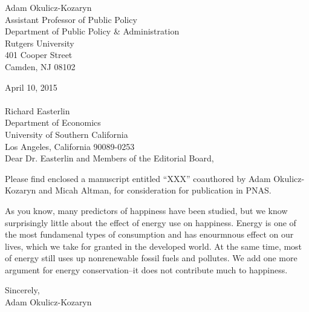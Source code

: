\documentclass[10pt, letterpaper]{article}
\date{ }
\title{}
\author{
}
\begin{document}
\begin{flushright}
Adam Okulicz-Kozaryn\\
Assistant Professor of Public Policy\\
Department of Public Policy \& Administration\\
Rutgers University\\
401 Cooper Street\\
Camden, NJ 08102\\
\end{flushright}


\noindent April 10, 2015\\ \\
Richard Easterlin\\
Department of Economics\\
University of Southern California\\
Los Angeles, California 90089-0253\\

\noindent Dear Dr. Easterlin  and Members of the Editorial Board, %


Please find enclosed a manuscript entitled ``XXX'' coauthored by Adam
Okulicz-Kozaryn and Micah Altman, for consideration for publication in PNAS. 



As you know, many predictors of happiness have been studied, but we know
surprisingly little about the effect of energy use on happiness. Energy is one
of the most fundamenal types of consumption and has enourmnous effect on our
lives, which we take for granted in the developed world. At the same time, 
 most of energy still uses up nonrenewable fossil fuels and pollutes. We add one
 more argument for energy conservation--it does not contribute much to
 happiness.     


Sincerely,\\

Adam Okulicz-Kozaryn



\maketitle
\vspace{-.4in}
\begin{center}

\end{center}
\end{document}
